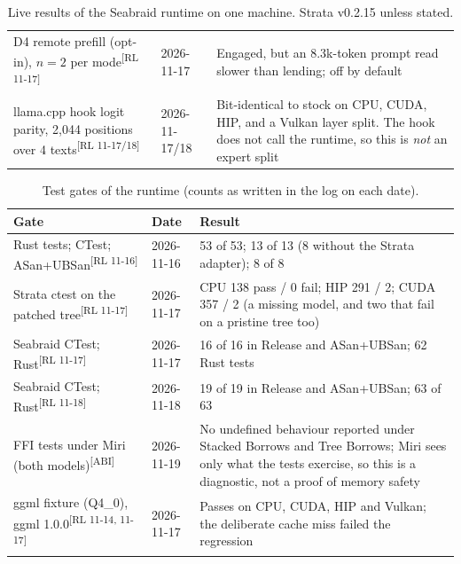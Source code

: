 \documentclass[11pt]{article}
\newcommand{\product}{Seabraid}                 %
\newcommand{\rl}[1]{\textsuperscript{\textnormal{[#1]}}} %
\begin{document}
\begin{table}[t]
\begin{tabular}{@{}p{3.3cm}p{2.4cm}p{8.5cm}@{}}
D4 remote prefill (opt-in), $n=2$ per mode\rl{RL 11-17} & 2026-11-17 & Engaged, but an 8.3k-token prompt read slower than lending; off by default\\
llama.cpp hook logit parity, 2,044 positions over 4 texts\rl{RL 11-17/18} & 2026-11-17/18 & Bit-identical to stock on CPU, CUDA, HIP, and a Vulkan layer split. The hook does not call the runtime, so this is \emph{not} an expert split\\
\bottomrule
\end{tabular}
\caption{Live results of the \product{} runtime on one machine. Strata v0.2.15 unless stated.}
\label{tab:live}
\end{table}

\begin{table}[t]
\centering\footnotesize
\begin{tabular}{@{}p{4.6cm}p{2.2cm}p{7.4cm}@{}}
\toprule
Gate & Date & Result\\
\midrule
Rust tests; CTest; ASan+UBSan\rl{RL 11-16} & 2026-11-16 & 53 of 53; 13 of 13 (8 without the Strata adapter); 8 of 8\\
Strata ctest on the patched tree\rl{RL 11-17} & 2026-11-17 & CPU 138 pass / 0 fail; HIP 291 / 2; CUDA 357 / 2 (a missing model, and two that fail on a pristine tree too)\\
Seabraid CTest; Rust\rl{RL 11-17} & 2026-11-17 & 16 of 16 in Release and ASan+UBSan; 62 Rust tests\\
Seabraid CTest; Rust\rl{RL 11-18} & 2026-11-18 & 19 of 19 in Release and ASan+UBSan; 63 of 63\\
FFI tests under Miri (both models)\rl{ABI} & 2026-11-19 & No undefined behaviour reported under Stacked Borrows and Tree Borrows; Miri sees only what the tests exercise, so this is a diagnostic, not a proof of memory safety\\
ggml fixture (Q4\_0), ggml 1.0.0\rl{RL 11-14, 11-17} & 2026-11-17 & Passes on CPU, CUDA, HIP and Vulkan; the deliberate cache miss failed the regression\\
\bottomrule
\end{tabular}
\caption{Test gates of the runtime (counts as written in the log on each date).}
\label{tab:runtime}
\end{table}
\end{document}
